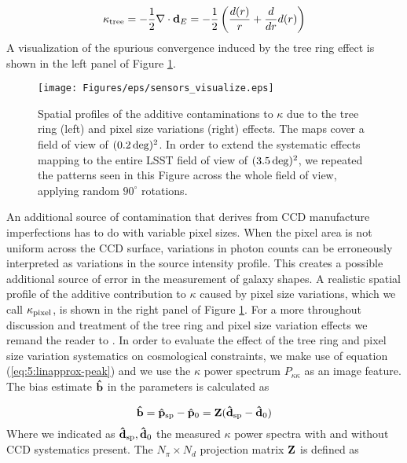 \begin{equation}
\label{eq:7:ktree}
\kappa_{\rm tree} = -\frac{1}{2}\nabla\cdot\mathbf{d}_E = -\frac{1}{2}\left(\frac{d(r)}{r}+\frac{d}{dr}d(r)\right)
\end{equation}   
%
A visualization of the spurious convergence induced by the tree ring effect is shown in the left panel of Figure \ref{fig:7:sensvis}. 
%
\begin{figure}
\begin{center}
\texttt{[image: Figures/eps/sensors\_visualize.eps]}
\end{center}
\caption{Spatial profiles of the additive contaminations to $\kappa$ due to the tree ring (left) and pixel size variations (right) effects. The maps cover a field of view of $(0.2\,{\rm deg})^2$. In order to extend the systematic effects mapping to the entire LSST field of view of $(3.5\,{\rm deg})^2$, we repeated the patterns seen in this Figure across the whole field of view, applying random $90^\circ$ rotations.}
\label{fig:7:sensvis}
\end{figure}
%
An additional source of contamination that derives from CCD manufacture imperfections has to do with variable pixel sizes. When the pixel area is not uniform across the CCD surface, variations in photon counts can be erroneously interpreted as variations in the source intensity profile. This creates a possible additional source of error in the measurement of galaxy shapes. A realistic spatial profile of the additive contribution to $\kappa$ caused by pixel size variations, which we call $\kappa_{\rm pixel}$, is shown in the right panel of Figure \ref{fig:7:sensvis}. For a more throughout discussion and treatment of the tree ring and pixel size variation effects we remand the reader to \citep{PetriCCD}. In order to evaluate the effect of the tree ring and pixel size variation systematics on cosmological constraints, we make use of equation (\ref{eq:5:linapprox-peak}) and we use the $\kappa$ power spectrum $P_{\kappa\kappa}$ as an image feature. The bias estimate $\mathbf{\hat{b}}$ in the parameters is calculated as 

\begin{equation}
\label{eq:7:biasccd}
\mathbf{\hat{b}} = \mathbf{\hat{p}}_{\rm sp}-\mathbf{\hat{p}}_0 = \mathbf{Z}(\mathbf{\hat{d}}_{\rm sp}-\mathbf{\hat{d}}_0)
\end{equation}
%
Where we indicated as $\mathbf{\hat{d}}_{\rm sp},\mathbf{\hat{d}}_0$ the measured $\kappa$ power spectra with and without CCD systematics present. The $N_\pi\times N_d$ projection matrix $\mathbf{Z}$ is defined as 

